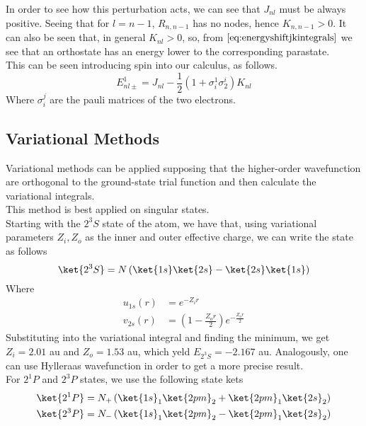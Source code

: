 \documentclass[a4paper, 11pt]{book}
\newcommand{\1}{\opr{\mathds{1}}}
\theoremstyle{plain}
\begin{document}
	In order to see how this perturbation acts, we can see that $J_{nl}$ must be always positive. Seeing that for $l=n-1$, $R_{n,n-1}$ has no nodes, hence $K_{n,n-1}>0$. It can also be seen that, in general $K_{nl}>0$, so, from $\eqref{eq:energyshiftjkintegrals}$ we see that an orthostate has an energy lower to the corresponding parastate.\\
	This can be seen introducing spin into our calculus, as follows.
	\begin{equation}
		E_{nl\pm}^1=J_{nl}-\frac{1}{2}\left( 1+\sigma_i^1\sigma^i_2 \right)K_{nl}
		\label{eq:spinenergyjk}
	\end{equation}
	Where $\sigma_i^j$ are the pauli matrices of the two electrons.\\
	\subsection{Variational Methods}
	Variational methods can be applied supposing that the higher-order wavefunction are orthogonal to the ground-state trial function and then calculate the variational integrals.\\
	This method is best applied on singular states.\\
	Starting with the $2^3S$ state of the atom, we have that, using variational parameters $Z_i,Z_o$ as the inner and outer effective charge, we can write the state as follows
	\begin{equation}
		\ket{2^3S}=N\left( \ket{1s}\ket{2s}-\ket{2s}\ket{1s} \right)
		\label{eq:tripletSvarstate}
	\end{equation}
	Where
	\begin{equation}
		\begin{aligned}
			u_{1s}(r)&=e^{-Z_ir}\\
			v_{2s}(r)&=\left( 1-\frac{Z_or}{2} \right)e^{-\frac{Z_or}{2}}
		\end{aligned}
		\label{eq:trialwavefunctionstripletS}
	\end{equation}
	Substituting into the variational integral and finding the minimum, we get $Z_i=2.01$ au and $Z_o=1.53$ au, which yeld $E_{2^3S}=-2.167$ au. Analogously, one can use Hylleraas wavefunction in order to get a more precise result.\\
	For $2^1P$ and $2^3P$ states, we use the following state kets
	\begin{equation}
		\begin{aligned}
			\ket{2^1P}&=N_+\left( \ket{1s}_1\ket{2pm}_2+\ket{2pm}_1\ket{2s}_2 \right)\\
			\ket{2^3P}&=N_-\left( \ket{1s}_1\ket{2pm}_2-\ket{2pm}_1\ket{2s}_2 \right)
		\end{aligned}
		\label{eq:2SPstateshe}
	\end{equation}
\end{document}
